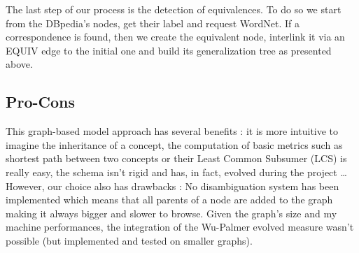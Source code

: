 The last step of our process is the detection of equivalences. To do so we start from the DBpedia's nodes, get their label and request WordNet. If a correspondence is found, then we create the equivalent node, interlink it via an EQUIV edge to the initial one and build its generalization tree as presented above.

\subsection{Pro-Cons} %
\label{sub:pro_cons}
This graph-based model approach has several benefits : it is more intuitive to imagine the inheritance of a concept, the computation of basic metrics such as shortest path between two concepts or their Least Common Subsumer (LCS) is really easy, the schema isn't rigid and has, in fact, evolved during the project \dots\\

However, our choice also has drawbacks : No disambiguation system has been implemented which means that all parents of a node are added to the graph making it always bigger and slower to browse. Given the graph's size and my machine performances, the integration of the Wu-Palmer evolved measure wasn't possible (but implemented and tested on smaller graphs).
